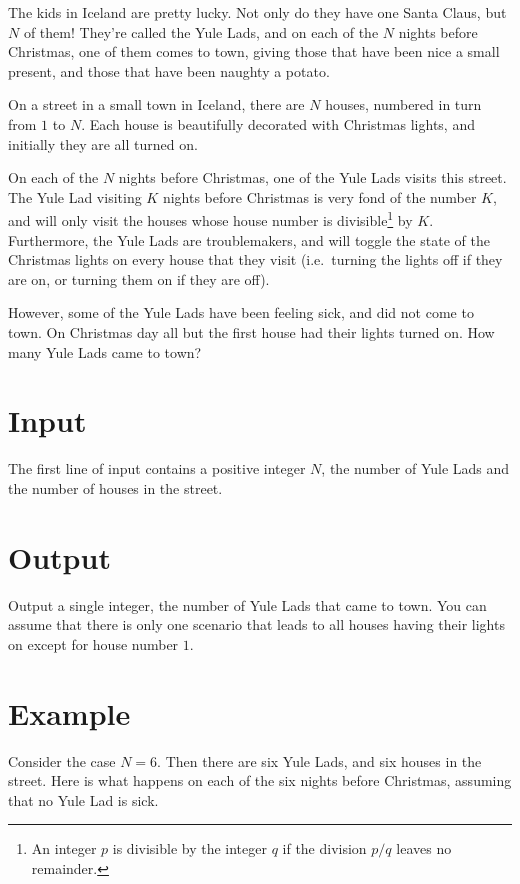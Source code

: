 
The kids in Iceland are pretty lucky. Not only do they have one Santa Claus,
but $N$ of them! They're called the Yule Lads, and on each of the $N$ nights
before Christmas, one of them comes to town, giving those that have been nice a
small present, and those that have been naughty a potato.

On a street in a small town in Iceland, there are $N$ houses, numbered
in turn from $1$ to $N$. Each house is beautifully decorated with
Christmas lights, and initially they are all turned on.

On each of the $N$ nights before Christmas, one of the Yule Lads visits this
street. The Yule Lad visiting $K$ nights before Christmas is very fond of the
number $K$, and will only visit the houses whose house number is
divisible\footnote{An integer $p$ is divisible by the integer $q$ if the
division $p/q$ leaves no remainder.} by $K$. Furthermore, the Yule Lads are
troublemakers, and will toggle the state of the Christmas lights on every house
that they visit (i.e.\ turning the lights off if they are on, or turning them
on if they are off).

However, some of the Yule Lads have been feeling sick, and did not come to
town. On Christmas day all but the first house had their lights turned on. How
many Yule Lads came to town?

\section*{Input}
The first line of input contains a positive integer $N$, the number of Yule
Lads and the number of houses in the street.

\section*{Output}
Output a single integer, the number of Yule Lads that came to town. You can
assume that there is only one scenario that leads to all houses having their
lights on except for house number $1$.



\section*{Example}
Consider the case $N = 6$. Then there are six Yule Lads, and six houses in the
street. Here is what happens on each of the six nights before Christmas,
assuming that no Yule Lad is sick.


